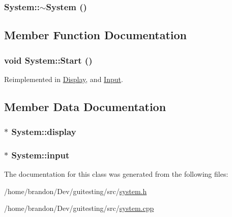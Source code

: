 \hypertarget{class_system_3be70bb338e3f062f821173fd15680d0}{
\subsubsection[{$\sim$System}]{\setlength{\rightskip}{0pt plus 5cm}System::$\sim$System ()}}
\label{class_system_3be70bb338e3f062f821173fd15680d0}




\subsection{Member Function Documentation}
\hypertarget{class_system_99d3c3036a58c1698f286677c4ace286}{
\subsubsection[{Start}]{\setlength{\rightskip}{0pt plus 5cm}void System::Start ()}}
\label{class_system_99d3c3036a58c1698f286677c4ace286}




Reimplemented in \hyperlink{class_display_b811555d7bb26dba257ec5e7924788d9}{Display}, and \hyperlink{class_input_1808108d296e25985cfd442d8a2c9d12}{Input}.

\subsection{Member Data Documentation}
\hypertarget{class_system_42b64214c5597b152328910e72f15545}{
\subsubsection[{display}]{ $\ast$ {\bf System::display}}}
\label{class_system_42b64214c5597b152328910e72f15545}


\hypertarget{class_system_d9b21648cf5dfb2f66eb3af1b9840cab}{
\subsubsection[{input}]{ $\ast$ {\bf System::input}}}
\label{class_system_d9b21648cf5dfb2f66eb3af1b9840cab}




The documentation for this class was generated from the following files:\begin{CompactItemize}
\item 
/home/brandon/Dev/guitesting/src/\hyperlink{system_8h}{system.h}\item 
/home/brandon/Dev/guitesting/src/\hyperlink{system_8cpp}{system.cpp}\end{CompactItemize}
